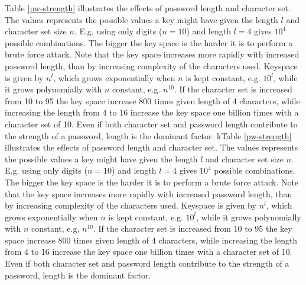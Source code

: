 Table \ref{pw-strength} illustrates the effects of password length and character set. The values represents the possible values a key might have given the length $l$ and character set size $n$. E.g. using only digits ($n=10$) and length $l=4$ gives $10^4$ possible combinations. The bigger the key space is the harder it is to perform a brute force attack. Note that the key space increases more rapidly with increased password length, than by increasing complexity of the characters used. Keyspace is given by $n^l$, which grows exponentially when $n$ is kept constant, e.g. $10^l$, while it grows polynomially with $n$ constant, e.g. $n^{10}$. If the character set is increased from 10 to 95 the key space increase 800 times given length of 4 characters, while increasing the length from 4 to 16 increase the key space one billion times with a character set of 10. Even if both character set and password length contribute to the strength of a password, length is the dominant factor.
kTable \ref{pw-strength} illustrates the effects of password length and character set. The values represents the possible values a key might have given the length $l$ and character set size $n$. E.g. using only digits ($n=10$) and length $l=4$ gives $10^4$ possible combinations. The bigger the key space is the harder it is to perform a brute force attack. Note that the key space increases more rapidly with increased password length, than by increasing complexity of the characters used. Keyspace is given by $n^l$, which grows exponentially when $n$ is kept constant, e.g. $10^l$, while it grows polynomially with $n$ constant, e.g. $n^{10}$. If the character set is increased from 10 to 95 the key space increase 800 times given length of 4 characters, while increasing the length from 4 to 16 increase the key space one billion times with a character set of 10. Even if both character set and password length contribute to the strength of a password, length is the dominant factor.



